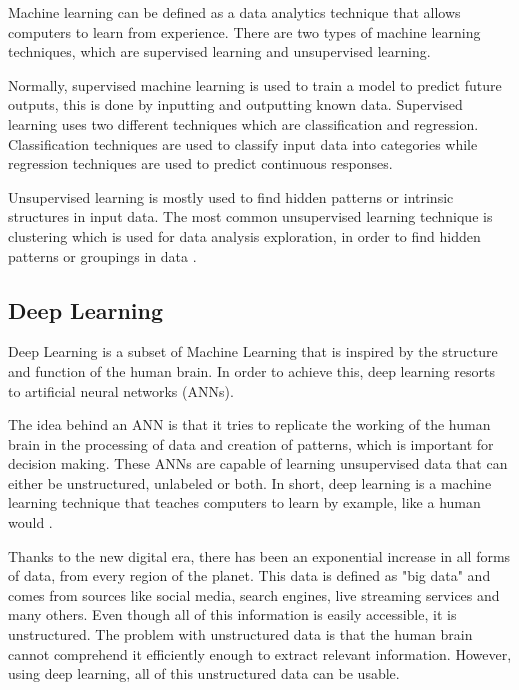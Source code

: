     \par Machine learning can be defined as a data analytics technique that allows computers to learn from experience. There are two types of machine learning techniques, which are supervised learning and unsupervised learning.
    \par Normally, supervised machine learning is used to train a model to predict future outputs, this is done by inputting and outputting known data. Supervised learning uses two different techniques which are classification and regression. Classification techniques are used to classify input data into categories while regression techniques are used to predict continuous responses. 
    \par Unsupervised learning is mostly used to find hidden patterns or intrinsic structures in input data. The most common unsupervised learning technique is clustering which is used for data analysis exploration, in order to find hidden patterns or groupings in data \cite{mathworks_ML}.

    \subsection{Deep Learning}

    \par Deep Learning is a subset of Machine Learning that is inspired by the structure and function of the human brain. In order to achieve this, deep learning resorts to artificial neural networks (ANNs).
    
    \par The idea behind an ANN is that it tries to replicate the working of the human brain in the processing of data and creation of patterns, which is important for decision making. These ANNs are capable of learning unsupervised data that can either be unstructured, unlabeled or both. In short, deep learning is a machine learning technique that teaches computers to learn by example, like a human would \cite{mathworks_deeplearning}.


    \par Thanks to the new digital era, there has been an exponential increase in all forms of data, from every region of the planet. This data is defined as "big data" and comes from sources like social media, search engines, live streaming services and many others. Even though all of this information is easily accessible, it is unstructured. The problem with unstructured data is that the human brain cannot comprehend it efficiently enough to extract relevant information. However, using deep learning, all of this unstructured data can be usable.

